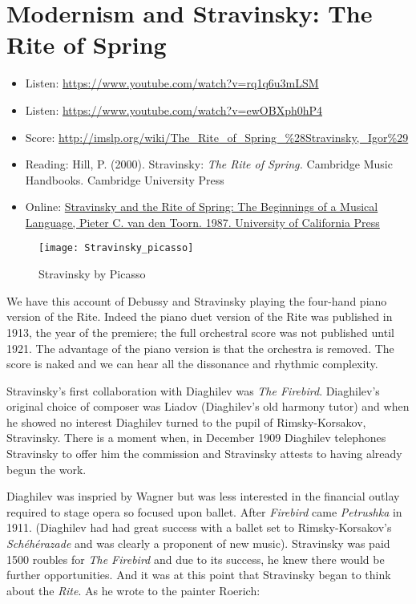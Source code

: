 \section{Modernism and Stravinsky: The Rite of Spring}
\begin{itemize}
\item Listen: \url{https://www.youtube.com/watch?v=rq1q6u3mLSM}
\item Listen: \url{https://www.youtube.com/watch?v=ewOBXph0hP4}
\item Score: \url{http://imslp.org/wiki/The_Rite_of_Spring_%28Stravinsky,_Igor%29}
\item Reading: Hill, P. (2000). Stravinsky: \textit{The Rite of Spring.} Cambridge Music Handbooks. Cambridge University Press
\item Online: \href{http://publishing.cdlib.org/ucpressebooks/view?docId=ft967nb647;brand=ucpress}{Stravinsky and the Rite of Spring: The Beginnings of a Musical Language, Pieter C. van den Toorn. 1987. University of California Press}

\end{itemize}

\begin{figure}[H]
\centering
\texttt{[image: Stravinsky\_picasso]}\caption{Stravinsky by Picasso}
\label{fig:stravpicasso}
\end{figure}

We have this account of Debussy and Stravinsky playing the four-hand piano version of the Rite. Indeed the piano duet version of the Rite was published in 1913, the year of the premiere; the full orchestral score was not published until 1921. The advantage of the piano version is that the orchestra is removed. The score is naked and we can hear all the dissonance and rhythmic complexity. 

Stravinsky's first collaboration with Diaghilev was \textit{The Firebird}. Diaghilev's original choice of composer was Liadov (Diaghilev's old harmony tutor) and when he showed no interest Diaghilev turned to the pupil of Rimsky-Korsakov, Stravinsky. There is a moment when, in December 1909 Diaghilev telephones Stravinsky to offer him the commission and Stravinsky attests to having already begun the work. 


Diaghilev was inspried by Wagner but was less interested in the financial outlay required to stage opera so focused upon ballet. After \textit{Firebird} came \textit{Petrushka} in 1911. (Diaghilev had had great success with a ballet set to Rimsky-Korsakov's \textit{Sch\'eh\'erazade} and was clearly a proponent of new music). Stravinsky was paid 1500 roubles for \textit{The Firebird} and due to its success, he knew there would be further opportunities. And it was at this point that Stravinsky began to think about the \textit{Rite}. As he wrote to the painter Roerich:

